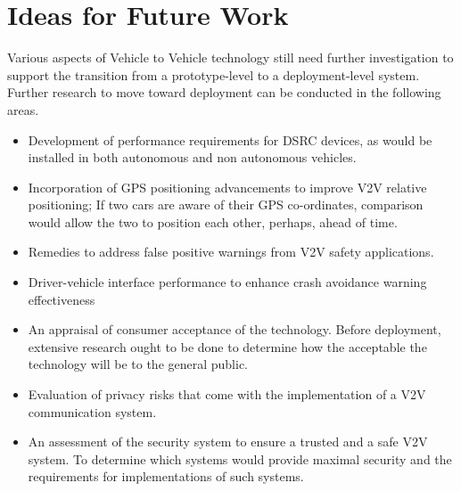 \documentclass[12pt]{report}
\begin{document}
\section{Ideas for Future Work}

Various aspects of Vehicle to Vehicle technology still need further investigation to support the transition from a prototype-level to a deployment-level system. Further research to move toward deployment can be conducted in the following areas.
\begin{itemize}
	\item Development of performance requirements for DSRC devices, as would be installed in both autonomous and non autonomous vehicles.
	\item Incorporation of GPS positioning advancements to improve V2V relative positioning; If two cars are aware of their GPS co-ordinates, comparison would allow the two to position each other, perhaps, ahead of time.
	\item Remedies to address false positive warnings from V2V safety applications. 
	\item Driver-vehicle interface performance to enhance crash avoidance warning effectiveness
	\item An appraisal of consumer acceptance of the technology. Before deployment, extensive research ought to be done to determine how the acceptable the technology will be to the general public.
	\item Evaluation of privacy risks that come with the implementation of a V2V communication system.
	\item An assessment of the security system to ensure a trusted and a safe V2V system. To determine which systems would provide maximal security and the requirements for implementations of such systems.
\end{itemize}


%


\end{document}
